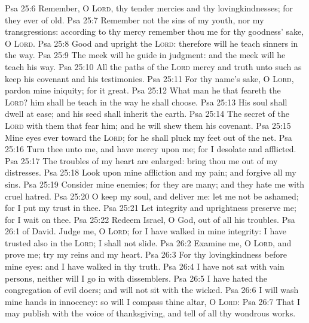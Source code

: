 \vs Psa 25:6 Remember, O \textsc{Lord}, thy tender mercies and thy lovingkindnesses; for they  ever of old.
\vs Psa 25:7 Remember not the sins of my youth, nor my transgressions: according to thy mercy remember thou me for thy goodness' sake, O \textsc{Lord}.
\vs Psa 25:8 Good and upright  the \textsc{Lord}: therefore will he teach sinners in the way.
\vs Psa 25:9 The meek will he guide in judgment: and the meek will he teach his way.
\vs Psa 25:10 All the paths of the \textsc{Lord}  mercy and truth unto such as keep his covenant and his testimonies.
\vs Psa 25:11 For thy name's sake, O \textsc{Lord}, pardon mine iniquity; for it  great.
\vs Psa 25:12 What man  he that feareth the \textsc{Lord}? him shall he teach in the way  he shall choose.
\vs Psa 25:13 His soul shall dwell at ease; and his seed shall inherit the earth.
\vs Psa 25:14 The secret of the \textsc{Lord}  with them that fear him; and he will shew them his covenant.
\vs Psa 25:15 Mine eyes  ever toward the \textsc{Lord}; for he shall pluck my feet out of the net.
\vs Psa 25:16 Turn thee unto me, and have mercy upon me; for I  desolate and afflicted.
\vs Psa 25:17 The troubles of my heart are enlarged:  bring thou me out of my distresses.
\vs Psa 25:18 Look upon mine affliction and my pain; and forgive all my sins.
\vs Psa 25:19 Consider mine enemies; for they are many; and they hate me with cruel hatred.
\vs Psa 25:20 O keep my soul, and deliver me: let me not be ashamed; for I put my trust in thee.
\vs Psa 25:21 Let integrity and uprightness preserve me; for I wait on thee.
\vs Psa 25:22 Redeem Israel, O God, out of all his troubles.
\vs Psa 26:1  of David. Judge me, O \textsc{Lord}; for I have walked in mine integrity: I have trusted also in the \textsc{Lord};  I shall not slide.
\vs Psa 26:2 Examine me, O \textsc{Lord}, and prove me; try my reins and my heart.
\vs Psa 26:3 For thy lovingkindness  before mine eyes: and I have walked in thy truth.
\vs Psa 26:4 I have not sat with vain persons, neither will I go in with dissemblers.
\vs Psa 26:5 I have hated the congregation of evil doers; and will not sit with the wicked.
\vs Psa 26:6 I will wash mine hands in innocency: so will I compass thine altar, O \textsc{Lord}:
\vs Psa 26:7 That I may publish with the voice of thanksgiving, and tell of all thy wondrous works.
